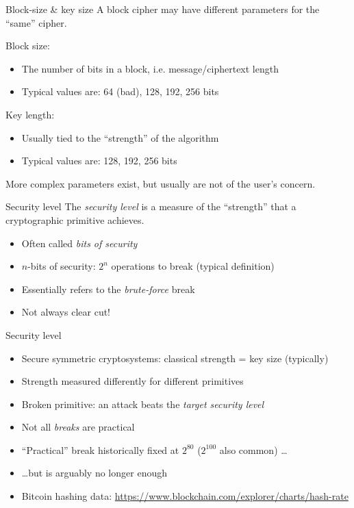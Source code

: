 \begin{frame}{Block-size \& key size}
  A block cipher may have different parameters for the \enquote{same} cipher.

  \pause
  Block size:
  \begin{itemize}[<+->]
    \item The number of bits in a block, i.e. message/ciphertext length
    \item Typical values are: 64 (bad), 128, 192, 256 bits
  \end{itemize}

  \pause
  Key length:
  \begin{itemize}[<+->]
    \item Usually tied to the \enquote{strength} of the algorithm
    \item Typical values are: 128, 192, 256 bits
  \end{itemize}

  \pause
  More complex parameters exist, but usually are not of the user's concern.
\end{frame}

\begin{frame}{Security level}
  \pause
  The \emph{security level} is a measure of the \enquote{strength} that a cryptographic primitive achieves.

  \begin{itemize}[<+(1)->]
    \item Often called \emph{bits of security}
    \item $n$-bits of security: $2^n$ operations to break (typical definition)
    \item Essentially refers to the \emph{brute-force} break
    \item Not always clear cut!
  \end{itemize}
\end{frame}

\begin{frame}{Security level}
  \begin{itemize}[<+->]
    \item Secure symmetric cryptosystems: classical strength = key size (typically)
    \item Strength measured differently for different primitives
    \item Broken primitive: an attack beats the \emph{target security level}
    \item Not all \emph{breaks} are practical
    \item \enquote{Practical} break historically fixed at $2^{80}$ ($2^{100}$ also common) \dots
    \item \dots{}but is arguably no longer enough
    \item Bitcoin hashing data: \url{https://www.blockchain.com/explorer/charts/hash-rate}
  \end{itemize}
\end{frame}

